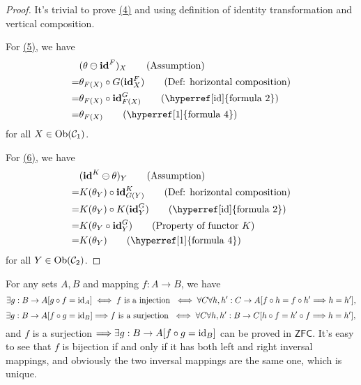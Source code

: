 \documentclass{article}
\begin{document}
\begin{proof}
	It's trivial to prove \hyperref[1]{(4)} and using definition of identity transformation and vertical composition.
	
	For \hyperref[2]{(5)}, we have
	\begin{align}
		 & (\theta\ominus\tid^F)_X\tag{Assumption}\\
		=& \theta_{F(X)}\circ G(\tid^F_X)\tag{Def: horizontal composition}\\
		=& \theta_{F(X)}\circ \tid^G_{F(X)}\tag{\hyperref[id]{formula 2}}\\
		=& \theta_{F(X)}\tag{\hyperref[1]{formula 4}}
	\end{align}
	for all $X\in\mathrm{Ob}(\mathcal{C}_1)$.
	
	For \hyperref[3]{(6)}, we have
	\begin{align}
		 & (\tid^K\ominus\theta)_Y\tag{Assumption}\\
		=& K(\theta_Y)\circ\tid^K_{G(Y)}\tag{Def: horizontal composition}\\
		=& K(\theta_Y)\circ K(\tid^G_Y)\tag{\hyperref[id]{formula 2}}\\
		=& K(\theta_Y\circ\tid^G_Y)\tag{Property of functor $K$}\\
		=& K(\theta_Y)\tag{\hyperref[1]{formula 4}}
	\end{align}
	for all $Y\in\mathrm{Ob}(\mathcal{C}_2)$.
\end{proof}


\begin{lmm}[$\mathsf{ZF}$]\label{map}
	For any sets $A,B$ and mapping $f:A\to B$, we have
		\[\exists g:B\to A[g\circ f=\mathrm{id}_A]\iff f\ \text{is a injection}\ \iff\forall C\forall h,h':C\to A[f\circ h=f\circ h'\Longrightarrow h=h'],\]
		\[\exists g:B\to A[f\circ g=\mathrm{id}_B]\Longrightarrow f\ \text{is a surjection}\ \iff\forall C\forall h,h':B\to C[h\circ f=h'\circ f\Longrightarrow h=h'],\]
	and $f$ is a surjection $\Longrightarrow \exists g:B\to A[f\circ g=\mathrm{id}_B]$ can be proved in $\mathsf{ZFC}$.
	It's easy to see that $f$ is bijection if and only if it has both left and right inversal mappings, and obviously the two inversal mappings are the same one, which is unique.
\end{lmm}
\end{document}
